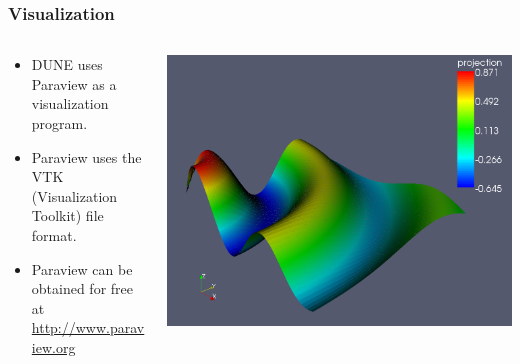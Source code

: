 \documentclass[ignorenonframetext,11pt]{beamer}
\theoremstyle{definition}
\begin{document}
\begin{frame}[fragile]
\frametitle{Visualization}

\begin{columns}[b]
\begin{column}{0.5\textwidth}
\begin{itemize}
\item DUNE uses Paraview as a visualization program.
\item Paraview uses the VTK (Visualization Toolkit) file format.
\item Paraview can be obtained for free at \url{http://www.paraview.org}
\end{itemize}
\end{column}
\begin{column}{0.5\textwidth}
\includegraphics[width=\textwidth]{figures/io/visualisation.png}
\end{column}
\end{columns}

\end{frame}

\end{document}
